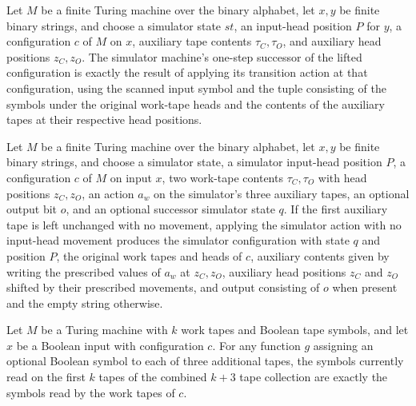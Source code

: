 \begin{theorem}
\label{Complexity.Meyer.lcfg_step}
\leanok
{}
Let $M$ be a finite Turing machine over the binary alphabet, let $x,y$ be finite binary
strings, and choose a simulator state $st$, an input-head position $P$ for $y$, a
configuration $c$ of $M$ on $x$, auxiliary tape contents $\tau_C,\tau_O$, and auxiliary
head positions $z_C,z_O$. The simulator machine's one-step successor of the lifted
configuration is exactly the result of applying its transition action at that
configuration, using the scanned input symbol and the tuple consisting of the symbols
under the original work-tape heads and the contents of the auxiliary tapes at their
respective head positions.
\end{theorem}

\begin{theorem}
\label{Complexity.Meyer.lcfg_apply_aux}
\leanok
{}
Let $M$ be a finite Turing machine over the binary alphabet, let $x,y$ be finite binary
strings, and choose a simulator state, a simulator input-head position $P$, a
configuration $c$ of $M$ on input $x$, two work-tape contents $\tau_C,\tau_O$ with head
positions $z_C,z_O$, an action $a_w$ on the simulator's three auxiliary tapes, an
optional output bit $o$, and an optional successor simulator state $q$. If the first
auxiliary tape is left unchanged with no movement, applying the simulator action with no
input-head movement produces the simulator configuration with state $q$ and position
$P$, the original work tapes and heads of $c$, auxiliary contents given by writing the
prescribed values of $a_w$ at $z_C,z_O$, auxiliary head positions $z_C$ and $z_O$
shifted by their prescribed movements, and output consisting of $o$ when present and the
empty string otherwise.
\end{theorem}

\begin{theorem}
\label{Complexity.Meyer.mreads}
\leanok
{}
Let $M$ be a Turing machine with $k$ work tapes and Boolean tape symbols, and let $x$ be
a Boolean input with configuration $c$. For any function $g$ assigning an optional
Boolean symbol to each of three additional tapes, the symbols currently read on the
first $k$ tapes of the combined $k+3$ tape collection are exactly the symbols read by
the work tapes of $c$.
\end{theorem}

